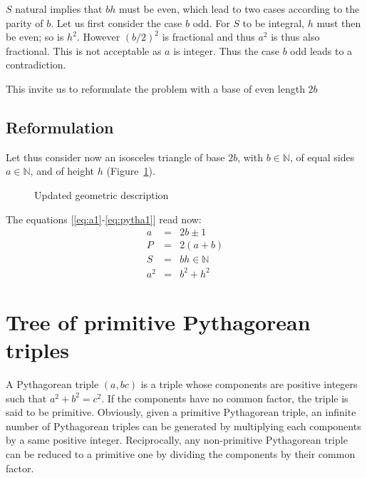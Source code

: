 \documentclass[11pt, twoside, a4paper]{article}
\newcommand{\Figure}[1]{Figure~\ref{#1}}
\newcommand{\Nat}{\mathbb{N}}
\begin{document}
    $S$ natural implies that $bh$ must be even, which lead to two cases according to the parity of $b$. Let us first consider the case $b$ odd. For $S$ to be integral, $h$ must then be even; so is $h^2$. However $(b/2)^2$ is fractional and thus $a^2$ is thus also fractional. This is not acceptable as $a$ is integer. Thus the case $b$ odd leads to a contradiction.

    This invite us to reformulate the problem with a base of even length $2b$

    \subsection{Reformulation}
    Let thus consider now an isosceles triangle of base $2b$, with $b\in\Nat$, of equal sides $a\in\Nat$, and of height $h$ (\Figure{fig:triangle2}).
    
    \begin{figure}[h!]
        \begin{center}
            \caption{Updated geometric description}
            \label{fig:triangle2}
        \end{center}
    \end{figure}
    
    The equations [\ref{eq:a1}-\ref{eq:pytha1}] read now:
    \begin{eqnarray}
    a & = & 2b \pm 1 \\
    P & = & 2(a+b) \\ 
    S & = & bh \in \Nat\\
    a^2 & = & b^2 + h^2 
    \end{eqnarray} 

\section{Tree of primitive Pythagorean triples}
A Pythagorean triple $(a, b c)$ is a triple whose components are positive integers such that $a^2+b^2=c^2$. If the components have no common factor, the triple is said to be primitive. Obviously, given a primitive Pythagorean triple, an infinite number of Pythagorean triples can be generated by multiplying each components by a same positive integer. Reciprocally, any non-primitive Pythagorean triple can be reduced to a primitive one by dividing the components by their common factor.
\end{document}
